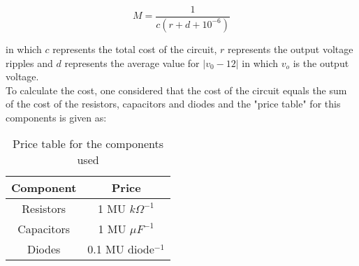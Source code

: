 \begin{equation}
    M = \frac{1}{c(r + d + 10^{-6})}
    \label{score}
\end{equation}

in which $c$ represents the total cost of the circuit, $r$ represents the output voltage ripples and $d$ represents the average value for $|v_0 - 12|$ in which $v_o$ is the output voltage.\\

To calculate the cost, one considered that the cost of the circuit equals the sum of the cost of the resistors, capacitors and diodes and the "price table" for this components is given as:

\begin{table}[H]
    \centering
    \begin{tabular}{c|c}
        \textbf{Component} &  \textbf{Price}\\
        \hline
        Resistors & 1 MU $k\Omega^{-1}$ \\
        Capacitors & 1 MU $\mu F^{-1}$ \\
        Diodes & 0.1 MU diode$^{-1}$
    \end{tabular}
    \caption{Price table for the components used}
    \label{tab:my_label}
\end{table}